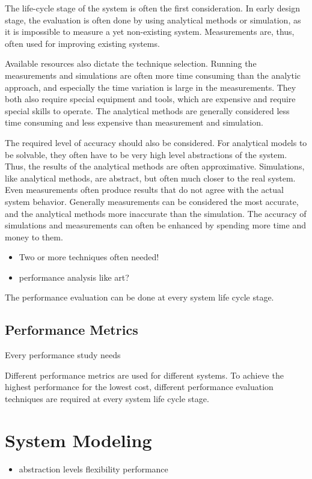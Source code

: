 The life-cycle stage of the system is often the first consideration. In early design stage, the evaluation is often done by using analytical methods or simulation, as it is impossible to measure a yet non-existing system. Measurements are, thus, often used for improving existing systems.

Available resources also dictate the technique selection. Running the measurements and simulations are often more time consuming \cite{Fujimoto:1990:PDE} than the analytic approach, and especially the time variation is large in the measurements. They both also require special equipment and tools, which are expensive and require special skills to operate. The analytical methods are generally considered less time consuming and less expensive than measurement and simulation. 

The required level of accuracy should also be considered. For analytical models to be solvable, they often have to be very high level abstractions of the system. Thus, the results of the analytical methods are often approximative. Simulations, like analytical methods, are abstract, but often much closer to the real system. Even measurements often produce results that do not agree with the actual system behavior. Generally measurements can be considered the most accurate, and the analytical methods more inaccurate than the simulation. The accuracy of simulations and measurements can often be enhanced by spending more time and money to them.

\begin{itemize}
\item Two or more techniques often needed!
\item performance analysis like art?
\end{itemize}


The performance evaluation can be done at every system life cycle stage.

\subsection{Performance Metrics}
Every performance study needs

Different performance metrics are used for different systems. To achieve the highest performance for the lowest cost, different performance evaluation techniques are required at every system life cycle stage.

\section{System Modeling}
\begin{itemize}
\item abstraction levels
\subitem flexibility
\subitem performance
\end{itemize}

